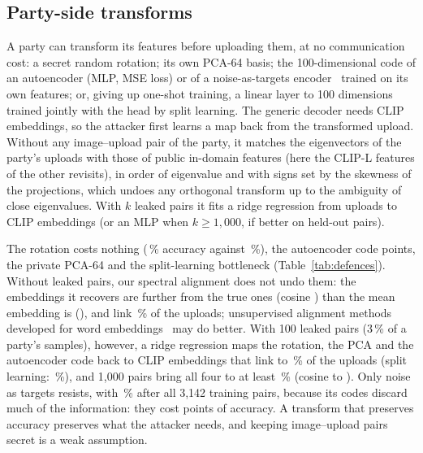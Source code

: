 \subsection{Party-side transforms}

A party can transform its features before uploading them, at no communication cost: a secret random rotation; its own PCA-64 basis; the 100-dimensional code of an autoencoder (MLP, MSE loss) or of a noise-as-targets encoder~\cite{bojanowski2017nat} trained on its own features; or, giving up one-shot training, a linear layer to 100 dimensions trained jointly with the head by split learning. The generic decoder needs CLIP embeddings, so the attacker first learns a map back from the transformed upload. Without any image--upload pair of the party, it matches the eigenvectors of the party's uploads with those of public in-domain features (here the CLIP-L features of the other revisits), in order of eigenvalue and with signs set by the skewness of the projections, which undoes any orthogonal transform up to the ambiguity of close eigenvalues. With $k$ leaked pairs it fits a ridge regression from uploads to CLIP embeddings (or an MLP when $k\ge1{,}000$, if better on held-out pairs).

The rotation costs nothing (\gdRotAcc\,\% accuracy against \gdPlainAcc\,\%), the autoencoder code \gdAeDrop{} points, the private PCA-64 \gdPcaDrop{} and the split-learning bottleneck \gdSplitDrop{} (Table~\ref{tab:defences}). Without leaked pairs, our spectral alignment does not undo them: the embeddings it recovers are further from the true ones (cosine \gdRotCosZero) than the mean embedding is (\giCosMean), and link \gdRotLinkZero\,\% of the uploads; unsupervised alignment methods developed for word embeddings~\cite{conneau2018word,grave2019wasserstein} may do better. With 100 leaked pairs (3\,\% of a party's samples), however, a ridge regression maps the rotation, the PCA and the autoencoder code back to CLIP embeddings that link \gdPcaLinkOneZeroZero{} to \gdAeLinkOneZeroZero\,\% of the uploads (split learning: \gdSplitLinkOneZeroZero\,\%), and 1{,}000 pairs bring all four to at least \gdSplitLinkOneZeroZeroZero\,\% (cosine \gdSplitCosOneZeroZeroZero{} to \gdRotCosOneZeroZeroZero). Only noise as targets resists, with \gdNatLinkThreeOneFourTwo\,\% after all 3{,}142 training pairs, because its codes discard much of the information: they cost \gdNatDrop{} points of accuracy. A transform that preserves accuracy preserves what the attacker needs, and keeping image--upload pairs secret is a weak assumption.


